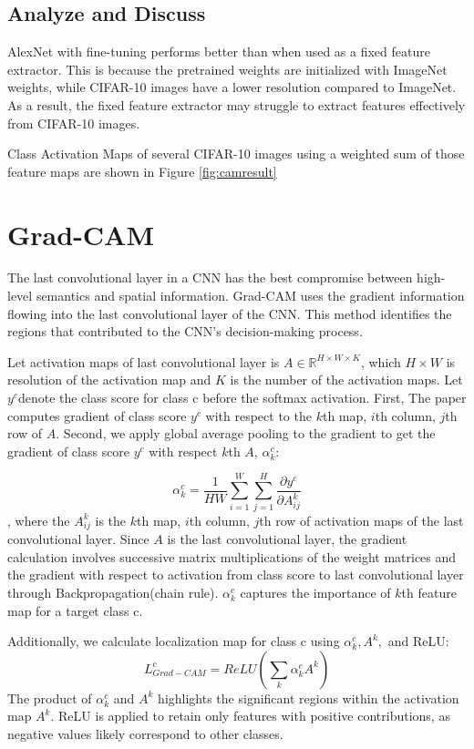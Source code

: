 \documentclass[extendedabs]{bmvc2k}
\begin{document}
\subsection{Analyze and Discuss}
AlexNet with fine-tuning performs better than when used as a fixed feature extractor. This is because the pretrained weights are initialized with ImageNet weights, while CIFAR-10 images have a lower resolution compared to ImageNet. As a result, the fixed feature extractor may struggle to extract features effectively from CIFAR-10 images.

Class Activation Maps of several CIFAR-10 images using a weighted sum of those feature maps are shown in Figure \ref{fig:camresult}

\section{Grad-CAM}
The last convolutional layer in a CNN has the best compromise between high-level semantics and spatial information. Grad-CAM uses the gradient information flowing into the last convolutional layer of the CNN. 
This method identifies the regions that contributed to the CNN's decision-making process.

Let activation maps of last convolutional layer is $A \in \mathbb{R}^{H\times W\times K}$, which $H\times W$ is resolution of the activation map and $K$ is the number of the activation maps. Let $y^c$denote the class score for class c before the softmax activation. First, The paper computes gradient of class score $y^c$ with respect to the $k$th map, $i$th column, $j$th row of $A$. Second, we apply global average pooling to the gradient to get the gradient of class score $y^c$ with respect $k$th $A$, $\alpha_k^c$:

$$ \label{exp:gradientavgpooling}
\alpha_k^c = \frac{1}{HW}\sum_{i=1}^W \sum_{j=1}^H \frac{\partial y^c}{\partial A^k_{ij}}
$$
, where the $A^k_{ij}$ is the $k$th map, $i$th column, $j$th row of activation maps of the last convolutional layer. Since $A$ is the last convolutional layer, the gradient calculation involves successive matrix multiplications of the weight matrices and the gradient with respect to activation from class score to last convolutional layer through Backpropagation(chain rule). $\alpha_k^c$ captures the importance of $k$th feature map for a target class c.

Additionally, we calculate localization map for class c using $\alpha_k^c, A^k,$ and ReLU:
$$
L^c_{Grad-CAM} = ReLU(\sum_k \alpha_k^c A^k)
$$
The product of $\alpha_k^c$ and $A^k$ highlights the significant regions within the activation map $A^k$.
ReLU is applied to retain only features with positive contributions, as negative values likely correspond to other classes.
\end{document}
